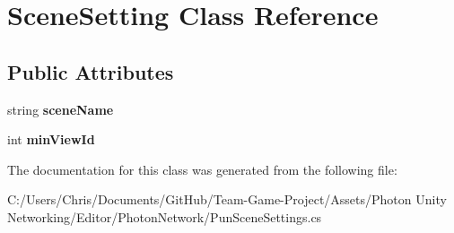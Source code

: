 \hypertarget{class_scene_setting}{}\section{Scene\+Setting Class Reference}
\label{class_scene_setting}
\subsection*{Public Attributes}
\begin{DoxyCompactItemize}
\item 
string {\bfseries scene\+Name}\hypertarget{class_scene_setting_a54ea00e40e7d064c886c5fd290d183f6}{}\label{class_scene_setting_a54ea00e40e7d064c886c5fd290d183f6}

\item 
int {\bfseries min\+View\+Id}\hypertarget{class_scene_setting_a805df6255b6432b46f90725bd60a27b1}{}\label{class_scene_setting_a805df6255b6432b46f90725bd60a27b1}

\end{DoxyCompactItemize}


The documentation for this class was generated from the following file\+:\begin{DoxyCompactItemize}
\item 
C\+:/\+Users/\+Chris/\+Documents/\+Git\+Hub/\+Team-\/\+Game-\/\+Project/\+Assets/\+Photon Unity Networking/\+Editor/\+Photon\+Network/Pun\+Scene\+Settings.\+cs\end{DoxyCompactItemize}
